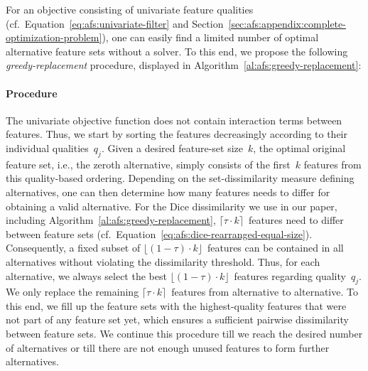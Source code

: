 \documentclass{article}
\theoremstyle{definition}
\begin{document}
For an objective consisting of univariate feature qualities (cf.~Equation~\ref{eq:afs:univariate-filter} and Section~\ref{sec:afs:appendix:complete-optimization-problem}), one can easily find a limited number of optimal alternative feature sets without a solver.
To this end, we propose the following \emph{greedy-replacement} procedure, displayed in Algorithm~\ref{al:afs:greedy-replacement}:

\paragraph{Procedure}

The univariate objective function does not contain interaction terms between features.
Thus, we start by sorting the features decreasingly according to their individual qualities~$q_j$.
Given a desired feature-set size~$k$, the optimal original feature set, i.e., the zeroth alternative, simply consists of the first~$k$ features from this quality-based ordering.
Depending on the set-dissimilarity measure defining alternatives, one can then determine how many features needs to differ for obtaining a valid alternative.
For the Dice dissimilarity we use in our paper, including Algorithm~\ref{al:afs:greedy-replacement}, $\lceil \tau \cdot k \rceil$~features need to differ between feature sets (cf.~Equation~\ref{eq:afs:dice-rearranged-equal-size}).
Consequently, a fixed subset of $\lfloor (1 - \tau) \cdot k \rfloor$~features can be contained in all alternatives without violating the dissimilarity threshold.
Thus, for each alternative, we always select the best $\lfloor (1 - \tau) \cdot k \rfloor$~features regarding quality~$q_j$.
We only replace the remaining $\lceil \tau \cdot k \rceil$~features from alternative to alternative.
To this end, we fill up the feature sets with the highest-quality features that were not part of any feature set yet, which ensures a sufficient pairwise dissimilarity between feature sets.
We continue this procedure till we reach the desired number of alternatives or till there are not enough unused features to form further alternatives.
\end{document}
